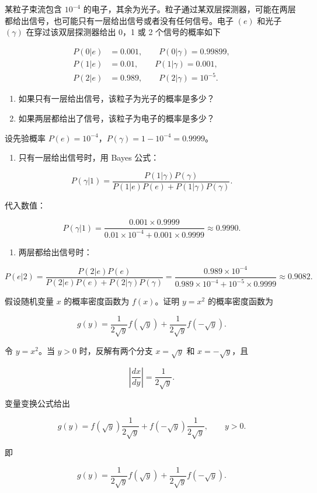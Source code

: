 \begin{question}
某粒子束流包含 \(10^{-4}\) 的电子，其余为光子。粒子通过某双层探测器，可能在两层都给出信号，也可能只有一层给出信号或者没有任何信号。电子 \((e)\) 和光子 \((\gamma)\) 在穿过该双层探测器给出 0，1 或 2 个信号的概率如下

\[
\begin{split}
P(0|e)&=0.001,\qquad P(0|\gamma)=0.99899,\\
P(1|e)&=0.01,\qquad P(1|\gamma)=0.001,\\
P(2|e)&=0.989,\qquad P(2|\gamma)=10^{-5}.
\end{split}
\]

\begin{enumerate}
\item
  如果只有一层给出信号，该粒子为光子的概率是多少？
\item
  如果两层都给出了信号，该粒子为电子的概率是多少？
\end{enumerate}
\begin{solution}
设先验概率 \(P(e)=10^{-4}\)，\(P(\gamma)=1-10^{-4}=0.9999\)。

\begin{enumerate}
\item
  只有一层给出信号时，用 Bayes 公式：
\end{enumerate}

\[
P(\gamma|1)=\frac{P(1|\gamma)P(\gamma)}{P(1|e)P(e)+P(1|\gamma)P(\gamma)}.
\]

代入数值：

\[
P(\gamma|1)=\frac{0.001\times0.9999}{0.01\times10^{-4}+0.001\times0.9999}
\approx0.9990.
\]

\begin{enumerate}[start=2]
\item
  两层都给出信号时：
\end{enumerate}

\[
P(e|2)=\frac{P(2|e)P(e)}{P(2|e)P(e)+P(2|\gamma)P(\gamma)}
=\frac{0.989\times10^{-4}}{0.989\times10^{-4}+10^{-5}\times0.9999}
\approx0.9082.
\]
\end{solution}
\end{question}



\begin{question}
假设随机变量 \(x\) 的概率密度函数为 \(f(x)\)。证明 \(y=x^2\) 的概率密度函数为

\[
g(y)=\frac{1}{2\sqrt{y}}f(\sqrt{y})+\frac{1}{2\sqrt{y}}f(-\sqrt{y}).
\]
\begin{solution}
令 \(y=x^2\)。当 \(y>0\) 时，反解有两个分支 \(x=\sqrt y\) 和
\(x=-\sqrt y\)，且

\[
\left|\frac{dx}{dy}\right|=\frac{1}{2\sqrt y}.
\]

变量变换公式给出

\[
g(y)=f(\sqrt y)\frac{1}{2\sqrt y}+f(-\sqrt y)\frac{1}{2\sqrt y},\qquad y>0.
\]

即

\[
g(y)=\frac{1}{2\sqrt y}f(\sqrt y)+\frac{1}{2\sqrt y}f(-\sqrt y).
\]
\end{solution}
\end{question}



